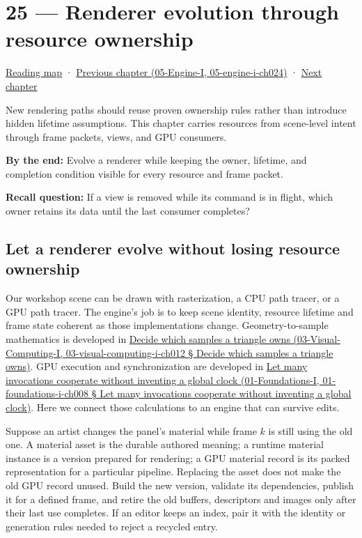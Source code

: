 \hypertarget{06-engine-ii-ch025}{}
\section{25 --- Renderer evolution through resource ownership}\label{renderer-evolution-through-resource-ownership}

\href{Chapter\%20Edition/03\%20-\%20Game\%20Engine/00\%20-\%20Reading\%20Map}{Reading map} · \href{}{Previous chapter (05-Engine-I, 05-engine-i-ch024)} · \hyperref[06-engine-ii-ch026]{Next chapter}

New rendering paths should reuse proven ownership rules rather than introduce hidden lifetime assumptions. This chapter carries resources from scene-level intent through frame packets, views, and GPU consumers.

\textbf{By the end:} Evolve a renderer while keeping the owner, lifetime, and completion condition visible for every resource and frame packet.

\textbf{Recall question:} If a view is removed while its command is in flight, which owner retains its data until the last consumer completes?

\subsection{Let a renderer evolve without losing resource ownership}\label{let-a-renderer-evolve-without-losing-resource-ownership}

Our workshop scene can be drawn with rasterization, a CPU path tracer, or a GPU path tracer. The engine's job is to keep scene identity, resource lifetime and frame state coherent as those implementations change. Geometry-to-sample mathematics is developed in \href{}{Decide which samples a triangle owns (03-Visual-Computing-I, 03-visual-computing-i-ch012 § Decide which samples a triangle owns)}. GPU execution and synchronization are developed in \href{}{Let many invocations cooperate without inventing a global clock (01-Foundations-I, 01-foundations-i-ch008 § Let many invocations cooperate without inventing a global clock)}. Here we connect those calculations to an engine that can survive edits.

Suppose an artist changes the panel's material while frame \(k\) is still using the old one. A material asset is the durable authored meaning; a runtime material instance is a version prepared for rendering; a GPU material record is its packed representation for a particular pipeline. Replacing the asset does not make the old GPU record unused. Build the new version, validate its dependencies, publish it for a defined frame, and retire the old buffers, descriptors and images only after their last use completes. If an editor keeps an index, pair it with the identity or generation rules needed to reject a recycled entry.

